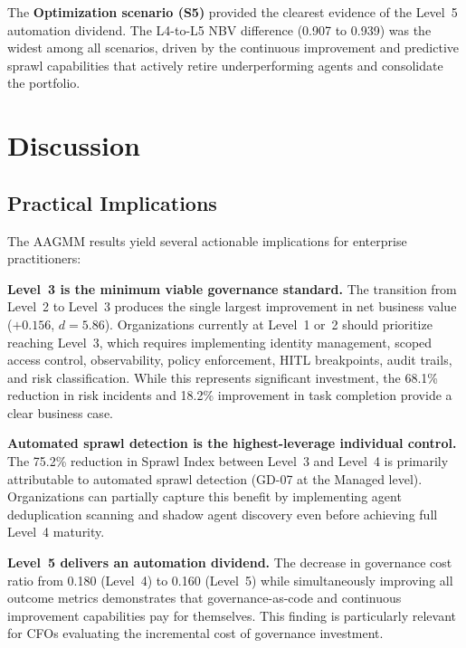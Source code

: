 \documentclass[ai,article,submit,pdftex,moreauthors]{Definitions/mdpi}
\begin{document}
The \textbf{Optimization scenario (S5)} provided the clearest evidence of the Level~5 automation dividend. The L4-to-L5 NBV difference (0.907 to 0.939) was the widest among all scenarios, driven by the continuous improvement and predictive sprawl capabilities that actively retire underperforming agents and consolidate the portfolio.


\section{Discussion}\label{sec:discussion}

\subsection{Practical Implications}\label{sec:disc-practical}

The AAGMM results yield several actionable implications for enterprise practitioners:

\textbf{Level~3 is the minimum viable governance standard.} The transition from Level~2 to Level~3 produces the single largest improvement in net business value ($+0.156$, $d = 5.86$). Organizations currently at Level~1 or~2 should prioritize reaching Level~3, which requires implementing identity management, scoped access control, observability, policy enforcement, HITL breakpoints, audit trails, and risk classification. While this represents significant investment, the 68.1\% reduction in risk incidents and 18.2\% improvement in task completion provide a clear business case.

\textbf{Automated sprawl detection is the highest-leverage individual control.} The 75.2\% reduction in Sprawl Index between Level~3 and Level~4 is primarily attributable to automated sprawl detection (GD-07 at the Managed level). Organizations can partially capture this benefit by implementing agent deduplication scanning and shadow agent discovery even before achieving full Level~4 maturity.

\textbf{Level~5 delivers an automation dividend.} The decrease in governance cost ratio from 0.180 (Level~4) to 0.160 (Level~5) while simultaneously improving all outcome metrics demonstrates that governance-as-code and continuous improvement capabilities pay for themselves. This finding is particularly relevant for CFOs evaluating the incremental cost of governance investment.
\end{document}
